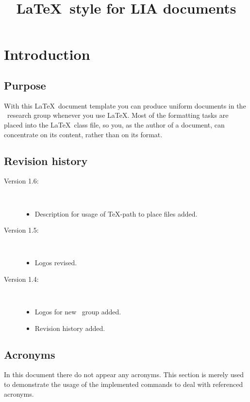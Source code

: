 \documentclass{lia}
\title{\LaTeX\ style for LIA documents}
\begin{document}
\maketitle

\section{Introduction}

\subsection{Purpose}

With this \LaTeX\ document template you can produce
uniform documents in the \Lia\ research group whenever you use \LaTeX.
Most of the formatting tasks are placed into the \LaTeX\ class file,
so you, as the author of a document, can concentrate on its content,
rather than on its format.

\subsection{Revision history}

\begin{description}
\item[Version 1.6:]~
\begin{itemize}
\item Description for usage of \TeX-path to place files added.
\end{itemize}
\item[Version 1.5:]~
\begin{itemize}
\item Logos revised.
\end{itemize}
\item[Version 1.4:]~
\begin{itemize}
\item Logos for new \Lia\ group added.
\item Revision history added.
\end{itemize}
\end{description}

\subsection{Acronyms}

In this document there do not appear any acronyms.
This section is merely used to demonstrate the usage of the
implemented commands to deal with referenced acronyms.
\end{document}
